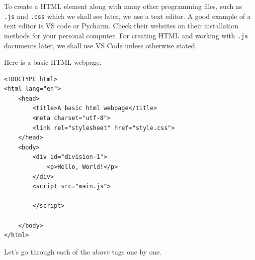 \documentclass[
]{book}
\begin{document}
To create a HTML element along with many other programming files, such as \texttt{.js} and \texttt{.css} which we shall see later, we use a text editor. A good example of a text editor is VS code or Pycharm. Check their websites on their installation methods for your personal computer. For creating HTML and working with \texttt{.js} documents later, we shall use VS Code unless otherwise stated.

Here is a basic HTML webpage.

\begin{verbatim}
<!DOCTYPE html>
<html lang="en">
    <head>
        <title>A basic html webpage</title>
        <meta charset="utf-8">
        <link rel="stylesheet" href="style.css">
    </head>
    <body>
        <div id="division-1">
            <p>Hello, World!</p>
        </div>
        <script src="main.js">

        </script>

    </body>
</html>
\end{verbatim}

Let's go through each of the above tags one by one.
\end{document}
